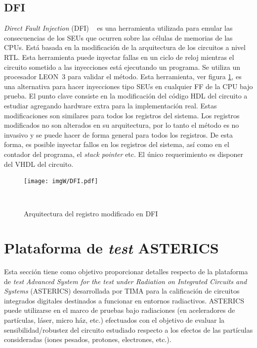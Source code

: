\documentclass[a4paper,openright,12pt]{report}
\begin{document}
\subsection{DFI}
\textit{Direct Fault Injection} (DFI) ~\cite{6261258}  es una herramienta  utilizada para emular las consecuencias de los SEUs que ocurren sobre las células de memorias de las CPUs. Está basada en la modificación de la arquitectura de los circuitos a nivel RTL. Esta herramienta puede inyectar fallas en un ciclo de reloj mientras el circuito sometido a las inyecciones está ejecutando un programa.
Se utiliza un procesador \mbox{LEON }3 para validar el método.
Esta herramienta, ver figura \ref{DFI}, es una alternativa para hacer inyecciones tipo SEUs en cualquier FF de la CPU bajo prueba. El punto clave  consiste en la modificación del código HDL del circuito a estudiar agregando hardware extra para la implementación real. Estas modificaciones son similares para todos los registros del sistema. Los registros modificados no son alterados en su arquitectura, por lo tanto el método es no invasivo y se puede hacer de forma general para todos los registros. De esta forma, es posible inyectar fallos en los registros del sistema, así  como en el contador del programa, el \textit{stack pointer} etc. El único requerimiento es  disponer del VHDL del circuito.



\begin{figure}[H]
	\centering
	\texttt{[image: imgW/DFI.pdf]}
	\caption{Arquitectura del registro modificado en DFI}
     ~\cite{6131392}
	\label{DFI}
\end{figure}




\section{Plataforma de \textit{test} ASTERICS}
Esta sección tiene como objetivo proporcionar detalles respecto  de la plataforma de \textit{test} \textit{Advanced System for the \textit{test} under Radiation on Integrated Circuits and Systems} (ASTERICS)  desarrollada por TIMA para la calificación de circuitos integrados digitales destinados a funcionar en entornos radiactivos. 
ASTERICS puede utilizarse en el marco de pruebas bajo radiaciones (en aceleradores de partículas, láser, micro ház, etc.) efectuados con el objetivo de evaluar la sensibilidad/robustez del circuito estudiado respecto a los efectos de las partículas consideradas (iones pesados, protones, electrones, etc.).
\end{document}
